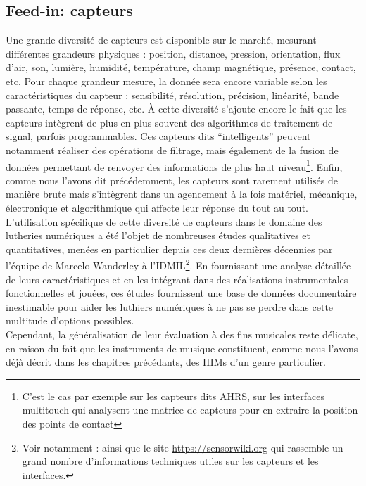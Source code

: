 
\subsection{Feed-in: capteurs}

\noindent Une grande diversité de capteurs est disponible sur le marché, mesurant différentes grandeurs physiques : position, distance, pression, orientation, flux d'air, son, lumière, humidité, température, champ magnétique, présence, contact, etc. Pour chaque grandeur mesure, la donnée sera encore variable selon les caractéristiques du capteur : sensibilité, résolution, précision, linéarité, bande passante, temps de réponse, etc. À cette diversité s'ajoute encore le fait que les capteurs intègrent de plus en plus souvent des algorithmes de traitement de signal, parfois programmables. Ces capteurs dits ``intelligents'' peuvent notamment réaliser des opérations de filtrage, mais également de la fusion de données permettant de renvoyer des informations de plus haut niveau\footnote{C'est le cas par exemple sur les capteurs dits \gls{AHRS}, sur les interfaces multitouch qui analysent une matrice de capteurs pour en extraire la position des points de contact}. Enfin, comme nous l'avons dit précédemment, les capteurs sont rarement utilisés de manière brute mais s'intègrent dans un agencement à la fois matériel, mécanique, électronique et algorithmique qui affecte leur réponse du tout au tout.\\
\indent L'utilisation spécifique de cette diversité de capteurs dans le domaine des lutheries numériques a été l'objet de nombreuses études qualitatives et quantitatives, menées en particulier depuis ces deux dernières décennies par l'équipe de Marcelo Wanderley à l'\gls{IDMIL}\footnote{Voir notamment : \cite{wanderley_choice_2000, hollinger_evaluation_2006, marshall_sensor_2009, vigliensoni_quantitative_2012, medeiros_comprehensive_2014} ainsi que le site \url{https://sensorwiki.org} qui rassemble un grand nombre d'informations techniques utiles sur les capteurs et les interfaces.}. En fournissant une analyse détaillée de leurs caractéristiques et en les intégrant dans des réalisations instrumentales fonctionnelles et jouées, ces études fournissent une base de données documentaire inestimable pour aider les luthiers numériques à ne pas se perdre dans cette multitude d'options possibles.\\
\indent Cependant, la généralisation de leur évaluation à des fins musicales reste délicate, en raison du fait que les instruments de musique constituent, comme nous l'avons déjà décrit dans les chapitres précédants, des \glspl{IHM} d'un genre particulier.

